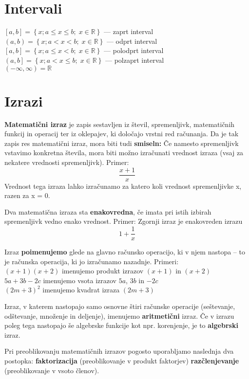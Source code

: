 \documentclass[a4paper,oneside,12pt,fleqn]{article}
\def\R{\ensuremath{\mathbb R}}
\numberwithin{equation}{section}
\begin{document}
\section{Intervali}
$\left[a,b \right] = \left\{x; a \leq x \leq b; \; x \in \R \right\}$ --- zaprt interval \\
$\left(a,b \right) = \left\{x; a < x < b; \; x \in \R \right\}$ --- odprt interval \\
$\left[a,b \right] = \left\{x; a \leq x < b; \; x \in \R \right\}$ --- polodprt interval \\
$\left(a,b \right] = \left\{x; a < x \leq b; \; x \in \R \right\}$ --- polzaprt interval \\
$(-\infty,\infty) = \R$

\section{Izrazi}
\textbf{Matematični izraz} je zapis sestavljen iz števil, spremenljivk, matematičnih funkcij in
operacij ter iz oklepajev, ki določajo vrstni red računanja. Da je tak zapis res
matematični izraz, mora biti tudi \textbf{smiseln:} Če namesto spremenljivk vstavimo konkretna
števila, mora biti možno izračunati vrednost izraza (vsaj za nekatere vrednosti
spremenljivk).
Primer:
\[ \frac{x + 1}{x} \]
Vrednost tega izraza lahko izračunamo za katero koli vrednost
spremenljivke x, razen za x = 0.

Dva matematična izraza sta \textbf{enakovredna}, če imata pri istih izbirah spremenljivk vedno
enako vrednost.
Primer: Zgornji izraz je enakovreden izrazu 
\[ 1 + \frac{1}{x} \]

Izraz \textbf{poimenujemo} glede na glavno računsko operacijo, ki v njem nastopa -- to je računska
operacija, ki jo izračunamo nazadnje.
Primeri: \\
$(x + 1)(x + 2)$ imenujemo produkt izrazov $(x + 1)$ in $(x + 2)$ \\
$5a + 3b - 2c$ imenujemo vsota izrazov $5a$, $3b$ in $-2c$ \\
$(2m + 3)^2$ imenujemo kvadrat izraza $(2m + 3)$

Izraz, v katerem nastopajo samo osnovne štiri računske operacije (seštevanje, odštevanje,
množenje in deljenje), imenujemo \textbf{aritmetični} izraz. Če v izrazu poleg tega nastopajo še
algebrske funkcije kot npr. korenjenje, je to \textbf{algebrski} izraz.

Pri preoblikovanju matematičnih izrazov pogosto uporabljamo naslednja dva postopka:
\textbf{faktorizacija} (preoblikovanje v produkt faktorjev)
\textbf{razčlenjevanje} (preoblikovanje v vsoto členov).
\end{document}
